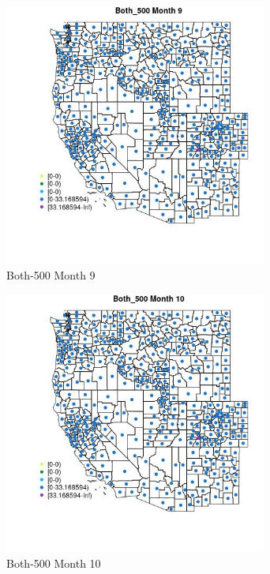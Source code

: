 \begin{figure} 
\centering  
\includegraphics[width=0.77\textwidth]{Code_Outputs/df_report_ML_predictors_CountyCentroid_Locations_Dates_2008-01-01to2018-12-31_MapObsMo9Both_500.jpg} 
\caption{\label{fig:df_report_ML_predictors_CountyCentroid_Locations_Dates_2008-01-01to2018-12-31MapObsMo9Both_500}Both-500 Month 9} 
\end{figure} 
 

\begin{figure} 
\centering  
\includegraphics[width=0.77\textwidth]{Code_Outputs/df_report_ML_predictors_CountyCentroid_Locations_Dates_2008-01-01to2018-12-31_MapObsMo10Both_500.jpg} 
\caption{\label{fig:df_report_ML_predictors_CountyCentroid_Locations_Dates_2008-01-01to2018-12-31MapObsMo10Both_500}Both-500 Month 10} 
\end{figure} 
 

